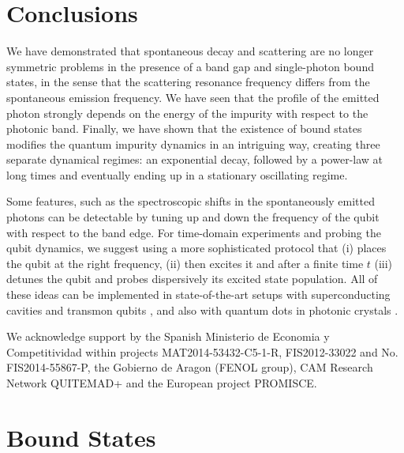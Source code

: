 \documentclass[aps,pra,twocolumn,floatfix,superscriptaddress]{revtex4-1}%
\begin{document}
\section{Conclusions}\label{sec:conclusions}

We have demonstrated that spontaneous decay and scattering are no longer symmetric problems in the presence of a band gap and single-photon bound states, in the sense that the scattering resonance frequency differs from the spontaneous emission frequency. We have seen that the profile of the emitted photon strongly depends on the energy of the impurity with respect to the photonic band. Finally, we have shown that the existence of bound states modifies the quantum impurity dynamics in an intriguing way, creating three separate dynamical regimes: an exponential decay, followed by a power-law at long times and eventually ending up in a stationary oscillating regime.

Some features, such as the spectroscopic shifts in the spontaneously emitted photons can be detectable by tuning up and down the frequency of the qubit with respect to the band edge. For time-domain experiments and probing the qubit dynamics, we suggest using a more sophisticated protocol that (i) places the qubit at the right frequency, (ii) then excites it and after a finite time $t$ (iii) detunes the qubit and probes dispersively its excited state population. All of these ideas can be implemented in state-of-the-art setups with superconducting cavities and transmon qubits \cite{liu2016}, and also with quantum dots in photonic crystals \cite{Arcari2014,Sollner2015,Lodahl2015}.


\begin{acknowledgements}
We acknowledge 
support by the Spanish Ministerio de Economia y Competitividad within projects MAT2014-53432-C5-1-R, FIS2012-33022 and No. FIS2014-55867-P, the Gobierno
de Aragon (FENOL group), CAM Research Network QUITEMAD+
and the European project PROMISCE.
\end{acknowledgements}

\appendix

\section{Bound States}\label{app:eigen}

\end{document}
